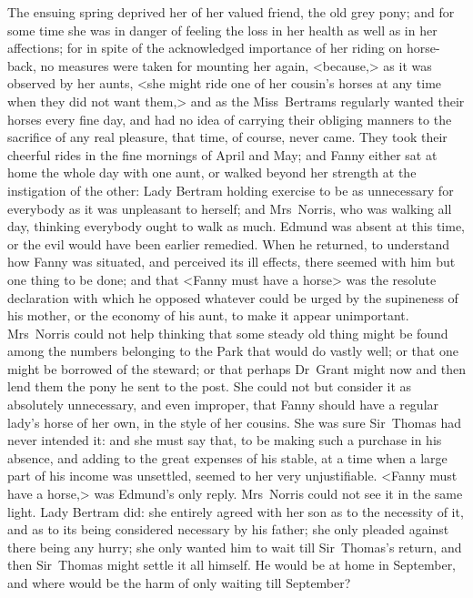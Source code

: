 The ensuing spring deprived her of her valued friend, the old grey pony; and for some time she was in danger of feeling the loss in her health as well as in her affections; for in spite of the acknowledged importance of her riding on horse-back, no measures were taken for mounting her again, <because,> as it was observed by her aunts, <she might ride one of her cousin's horses at any time when they did not want them,> and as the Miss~Bertrams regularly wanted their horses every fine day, and had no idea of carrying their obliging manners to the sacrifice of any real pleasure, that time, of course, never came. They took their cheerful rides in the fine mornings of April and May; and Fanny either sat at home the whole day with one aunt, or walked beyond her strength at the instigation of the other: Lady Bertram holding exercise to be as unnecessary for everybody as it was unpleasant to herself; and Mrs~Norris, who was walking all day, thinking everybody ought to walk as much. Edmund was absent at this time, or the evil would have been earlier remedied. When he returned, to understand how Fanny was situated, and perceived its ill effects, there seemed with him but one thing to be done; and that <Fanny must have a horse> was the resolute declaration with which he opposed whatever could be urged by the supineness of his mother, or the economy of his aunt, to make it appear unimportant. Mrs~Norris could not help thinking that some steady old thing might be found among the numbers belonging to the Park that would do vastly well; or that one might be borrowed of the steward; or that perhaps Dr~Grant might now and then lend them the pony he sent to the post. She could not but consider it as absolutely unnecessary, and even improper, that Fanny should have a regular lady's horse of her own, in the style of her cousins. She was sure Sir~Thomas had never intended it: and she must say that, to be making such a purchase in his absence, and adding to the great expenses of his stable, at a time when a large part of his income was unsettled, seemed to her very unjustifiable. <Fanny must have a horse,> was Edmund's only reply. Mrs~Norris could not see it in the same light. Lady Bertram did: she entirely agreed with her son as to the necessity of it, and as to its being considered necessary by his father; she only pleaded against there being any hurry; she only wanted him to wait till Sir~Thomas's return, and then Sir~Thomas might settle it all himself. He would be at home in September, and where would be the harm of only waiting till September?

